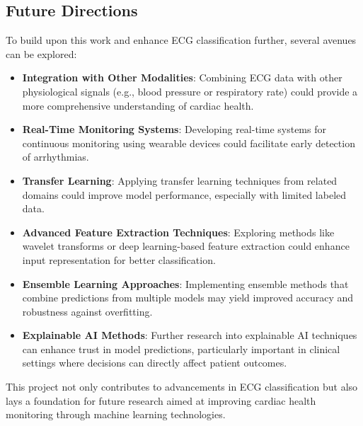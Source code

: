 \documentclass[nonacm,sigconf]{acmart}
\begin{document}
\subsection{Future Directions}
To build upon this work and enhance ECG classification further, several avenues can be explored:
\begin{itemize}
    \item \textbf{Integration with Other Modalities}: Combining ECG data with other physiological signals (e.g., blood pressure or respiratory rate) could provide a more comprehensive understanding of cardiac health.
    \item \textbf{Real-Time Monitoring Systems}: Developing real-time systems for continuous monitoring using wearable devices could facilitate early detection of arrhythmias.
    \item \textbf{Transfer Learning}: Applying transfer learning techniques from related domains could improve model performance, especially with limited labeled data.
    \item \textbf{Advanced Feature Extraction Techniques}: Exploring methods like wavelet transforms or deep learning-based feature extraction could enhance input representation for better classification.
    \item \textbf{Ensemble Learning Approaches}: Implementing ensemble methods that combine predictions from multiple models may yield improved accuracy and robustness against overfitting.
    \item \textbf{Explainable AI Methods}: Further research into explainable AI techniques can enhance trust in model predictions, particularly important in clinical settings where decisions can directly affect patient outcomes.
\end{itemize}

This project not only contributes to advancements in ECG classification but also lays a foundation for future research aimed at improving cardiac health monitoring through machine learning technologies.







  
\end{document}
